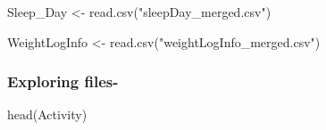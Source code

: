 \documentclass[
]{article}
\newenvironment{Shaded}{\begin{snugshade}}{\end{snugshade}}
\newcommand{\FunctionTok}[1]{\textcolor[rgb]{0.00,0.00,0.00}{#1}}
\newcommand{\NormalTok}[1]{#1}
\newcommand{\OtherTok}[1]{\textcolor[rgb]{0.56,0.35,0.01}{#1}}
\newcommand{\StringTok}[1]{\textcolor[rgb]{0.31,0.60,0.02}{#1}}
\begin{document}
\begin{Shaded}
\begin{Highlighting}[]
\NormalTok{Sleep\_Day }\OtherTok{\textless{}{-}} \FunctionTok{read.csv}\NormalTok{(}\StringTok{"sleepDay\_merged.csv"}\NormalTok{)}
\end{Highlighting}
\end{Shaded}

\begin{Shaded}
\begin{Highlighting}[]
\NormalTok{WeightLogInfo }\OtherTok{\textless{}{-}} \FunctionTok{read.csv}\NormalTok{(}\StringTok{"weightLogInfo\_merged.csv"}\NormalTok{)}
\end{Highlighting}
\end{Shaded}

\hypertarget{exploring-files-}{%
\subsubsection{Exploring files-}\label{exploring-files-}}

\begin{Shaded}
\begin{Highlighting}[]
\FunctionTok{head}\NormalTok{(Activity)}
\end{Highlighting}
\end{Shaded}
\end{document}
